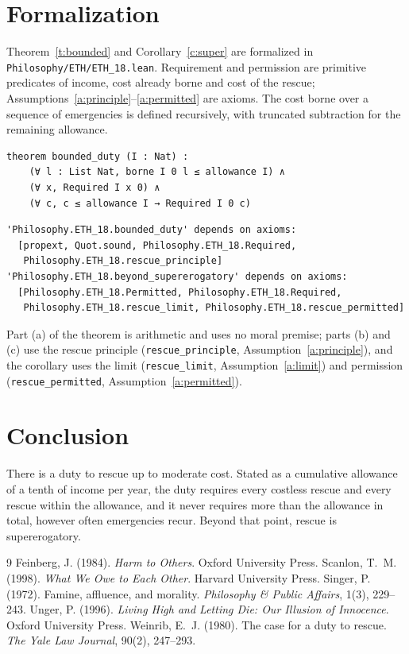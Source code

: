 \documentclass{situationist-preprint}
\begin{document}
\section{Formalization}

Theorem~\ref{t:bounded} and Corollary~\ref{c:super} are formalized in \nolinkurl{Philosophy/ETH/ETH_18.lean}. Requirement and permission are primitive predicates of income, cost already borne and cost of the rescue; Assumptions~\ref{a:principle}--\ref{a:permitted} are axioms. The cost borne over a sequence of emergencies is defined recursively, with truncated subtraction for the remaining allowance.

\begin{lstlisting}
theorem bounded_duty (I : Nat) :
    (∀ l : List Nat, borne I 0 l ≤ allowance I) ∧
    (∀ x, Required I x 0) ∧
    (∀ c, c ≤ allowance I → Required I 0 c)
\end{lstlisting}

\begin{lstlisting}
'Philosophy.ETH_18.bounded_duty' depends on axioms:
  [propext, Quot.sound, Philosophy.ETH_18.Required,
   Philosophy.ETH_18.rescue_principle]
'Philosophy.ETH_18.beyond_supererogatory' depends on axioms:
  [Philosophy.ETH_18.Permitted, Philosophy.ETH_18.Required,
   Philosophy.ETH_18.rescue_limit, Philosophy.ETH_18.rescue_permitted]
\end{lstlisting}

Part (a) of the theorem is arithmetic and uses no moral premise; parts (b) and (c) use the rescue principle (\texttt{rescue\_principle}, Assumption~\ref{a:principle}), and the corollary uses the limit (\texttt{rescue\_limit}, Assumption~\ref{a:limit}) and permission (\texttt{rescue\_permitted}, Assumption~\ref{a:permitted}).

\section{Conclusion}

There is a duty to rescue up to moderate cost. Stated as a cumulative allowance of a tenth of income per year, the duty requires every costless rescue and every rescue within the allowance, and it never requires more than the allowance in total, however often emergencies recur. Beyond that point, rescue is supererogatory.

\begin{thebibliography}{9}\small
{} Feinberg, J. (1984). \emph{Harm to Others}. Oxford University Press.
 Scanlon, T.~M. (1998). \emph{What We Owe to Each Other}. Harvard University Press.
 Singer, P. (1972). Famine, affluence, and morality. \emph{Philosophy \& Public Affairs}, 1(3), 229--243.
 Unger, P. (1996). \emph{Living High and Letting Die: Our Illusion of Innocence}. Oxford University Press.
 Weinrib, E.~J. (1980). The case for a duty to rescue. \emph{The Yale Law Journal}, 90(2), 247--293.
\end{thebibliography}
\end{document}
